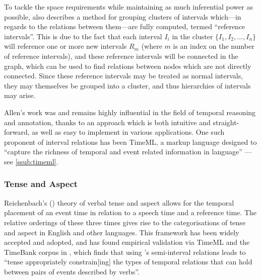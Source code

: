 \documentclass[a4paper,12pt,leqno,twoside]{article}
\newcommand{\nb}[1]{{\color{red}[NB\footnote{{\color{red}#1}}]}}
\begin{document}
To tackle the space requirements while maintaining as much inferential power as possible, \citet[p. 838]{allen1983maintaining} also describes a method for grouping clusters of intervals which---in regards to the relations between them---are fully computed, termed ``reference intervals''. This is due to the fact that each interval $I_i$ in the cluster $\{I_1, I_2, ..., I_n\}$ will reference one or more new intervals $R_m$ (where $m$ is an index on the number of reference intervals), and these reference intervals will be connected in the graph, which can be used to find relations between nodes which are not directly connected. Since these reference intervals may be treated as normal intervals, they may themselves be grouped into a cluster, and thus hierarchies of intervals may arise.%

Allen's work was and remains highly influential in the field of temporal reasoning and annotation, thanks to an approach which is both intuitive and straight-forward, as well as easy to implement in various applications. One such proponent of interval relations has been TimeML, a markup language designed to ``capture the richness of temporal and event related information in language'' \citep[p. 123]{Pustejovsky2005}---see \cref{ssub:timeml}.


\subsubsection{Tense and Aspect}\label{ssub:tenseaspect}
Reichenbach's (\citeyear{reichenbach1947elements}) theory of verbal tense and aspect allows for the temporal placement of an event time in relation to a speech time and a reference time. The relative orderings of these three times gives rise to the categorisations of tense and aspect in English and other languages. This framework has been widely accepted and adopted, and has found empirical validation via TimeML \citep{timeml2005timeml} and the TimeBank corpus \citep{pustejovsky2003timebank} in \citet{Derczynski2013}, which finds that using \citet{Freksa1992}'s semi-interval relations leads to ``tense appropriately constrain[ing] the types of temporal relations that can hold between pairs of events described by verbs''.

\end{document}
